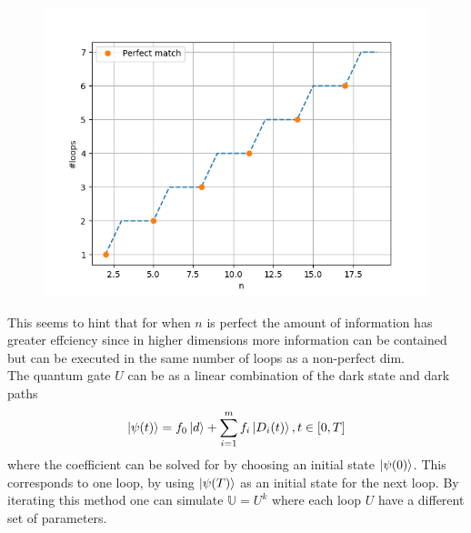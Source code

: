 \begin{figure}[H]
\centering
\includegraphics[scale=0.6]{figures/perfect_dim.png}
\end{figure}

This seems to hint that for when $n$ is perfect the amount of information has greater effciency since in higher dimensions more information can be contained but can be executed in the same number of loops as a non-perfect dim. 
\\ 
The quantum gate $U$ can be as a linear combination of the dark state and dark paths
\begin{equation}
\ket{\psi(t)} = f_0\ket{d} + \sum_{i = 1}^{m}f_i\ket{D_i(t)}, t \in [0,T]
\end{equation}
where the coefficient can be solved for by choosing an initial state $\ket{\psi(0)}$. This corresponds to one loop, by using $\ket{\psi(T)}$ as an initial state for the next loop. By iterating this method one can simulate $\mathbb{U} = U^k$ where each loop $U$ have a different set of parameters.





